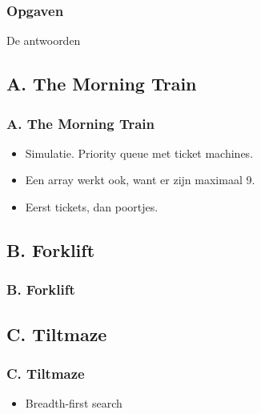 \documentclass[14pt]{beamer}
\begin{document}

\begin{frame}
  \frametitle{Opgaven}
  \begin{center}
    \Huge{De antwoorden}
  \end{center}
\end{frame}

\subsection{A. The Morning Train}
\begin{frame}
  \frametitle{A. The Morning Train}
    \large
    \begin{itemize}
      \vspace*{-2mm}
      \item Simulatie.
            Priority queue met ticket machines.
      \vspace*{5mm}
      \item Een array werkt ook, want er zijn maximaal 9.
      \vspace*{5mm}
      \item Eerst tickets, dan poortjes.
    \end{itemize}
\end{frame}

\subsection{B. Forklift}
\begin{frame}
  \frametitle{B. Forklift}
\end{frame}

\subsection{C. Tiltmaze}
\begin{frame}
  \frametitle{C. Tiltmaze}
    \large
    \begin{itemize}
      \vspace*{-2mm}
      \item Breadth-first search
    \end{itemize}
\end{frame}
\end{document}
